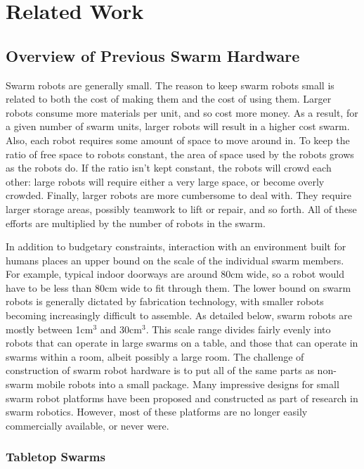 \chapter{Related Work}

\section{Overview of Previous Swarm Hardware} \label{section:Overview_of_Previous_Swarm_Hardware}

Swarm robots are generally small. 
The reason to keep swarm robots small is related to both the cost of making them and the cost of using them. 
Larger robots consume more materials per unit, and so cost more money.
As a result, for a given number of swarm units, larger robots will result in a higher cost swarm. 
Also, each robot requires some amount of space to move around in. 
To keep the ratio of free space to robots constant, the area of space used by the robots grows as the robots do. 
If the ratio isn't kept constant, the robots will crowd each other: large robots will require either a very large space, or become overly crowded.
Finally, larger robots are more cumbersome to deal with. 
They require larger storage areas, possibly teamwork to lift or repair, and so forth. 
All of these efforts are multiplied by the number of robots in the swarm. 
 
In addition to budgetary constraints, interaction with an environment built for humans places an upper bound on the scale of the individual swarm members. 
For example, typical indoor doorways are around 80cm wide, so a robot would have to be less than 80cm wide to fit through them. 
The lower bound on swarm robots is generally dictated by fabrication technology, with smaller robots becoming increasingly difficult to assemble. 
As detailed below, swarm robots are mostly between 1cm$^3$ and 30cm$^3$. 
This scale range divides fairly evenly into robots that can operate in large swarms on a table, and those that can operate in swarms within a room, albeit possibly a large room. 
The challenge of construction of swarm robot hardware is to put all of the same parts as non-swarm mobile robots into a small package.
Many impressive designs for small swarm robot platforms have been proposed and constructed as part of research in swarm robotics. 
However, most of these platforms are no longer easily commercially available, or never were. 

\subsection{Tabletop Swarms} \label{section:Tabletop_Swarms}

